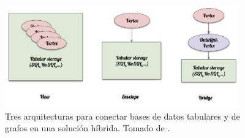 \documentclass[pdflatex,sn-mathphys-num]{sn-jnl}
\theoremstyle{thmstyleone}%
\theoremstyle{thmstyletwo}%
\theoremstyle{thmstylethree}%
\begin{document}
\begin{figure}[H]
    \centering
    \includegraphics[width=0.9\textwidth]{figs/multidb-1.png}
    \caption{Tres arquitecturas para conectar bases de datos tabulares y de grafos en una solución híbrida. Tomado de \cite{multidb}.}
    \label{multidb-1}
\end{figure}
\end{document}
